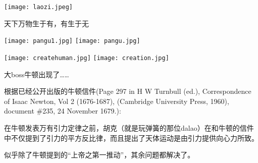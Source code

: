 \documentclass[CJK]{beamer}
\begin{document}
\begin{frame}
\bch
\begin{minipage}{0.45\textwidth}
\texttt{[image: laozi.jpeg]}
\end{minipage}
\begin{minipage}{0.45\textwidth}
{\Large 天下万物生于有，有生于无}
\end{minipage}
\ech
\end{frame}


\begin{frame}
\bch

\texttt{[image: pangu1.jpg]}
\emini
{}
\texttt{[image: pangu.jpg]}
\emini

\ech
\end{frame}

\begin{frame}
\bch
\texttt{[image: createhuman.jpg]}
\texttt{[image: creation.jpg]}
\ech
\end{frame}

\begin{frame}
  \bch
  {\Large
  大boss牛顿出现了……}
  \ech
\end{frame}


\begin{frame}
  \bch
  \ech
\end{frame}


\begin{frame}
  \bch
  \ech
\end{frame}


\begin{frame}
  \bch

  根据已经公开出版的牛顿信件{\scriptsize (Page 297 in H W Turnbull (ed.), Correspondence of Isaac Newton, Vol 2 (1676-1687), (Cambridge University Press, 1960), document \#235, 24 November 1679.)}:
  
  {\blue 在牛顿发表万有引力定律之前，胡克（就是玩弹簧的那位dalao）在和牛顿的信件中不仅提到了引力的平方反比律，而且提出了天体运动是由引力提供向心力所致。}

  \ech
\end{frame}

\begin{frame}

  \bch
  似乎除了牛顿提到的“上帝之第一推动”，其余问题都解决了。
  \ech
\end{frame}
\end{document}
